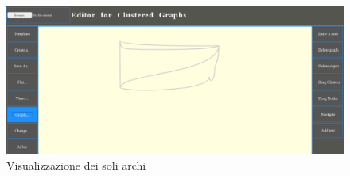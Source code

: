 {\begin{figure}[!htb]
	\begin{center}
		\includegraphics[width=1 \linewidth]{figure/edgesOnly}
	\end{center}
	\caption{Visualizzazione dei soli archi\label{fig:edgesOnly}}
\end{figure}

}
